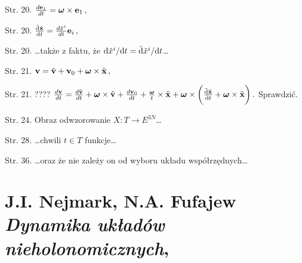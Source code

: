 \documentclass[a4paper,11pt]{article}
\numberwithin{equation}{section}
\begin{document}
Str. 20.
$\frac{ d\mathbf{e}_{ 1 } }{ dt } = \boldsymbol{\omega} \times \mathbf{e}_{ 1 } \, ,$

Str. 20.
$\frac{ \tilde{ \mathrm{d} } \tilde{ \mathbf{x} } }{ \mathrm{d} t }
= \frac{ d\tilde{ x }^{ i } }{ dt } \mathbf{e}_{ i } \, ,$

Str. 20. \ldots także z faktu, że
$\mathrm{d} \tilde{ x }^{ i } / \mathrm{d} t = \tilde{ \mathrm{d} } \tilde{ x
}^{ i } / \mathrm{d} t$\ldots

Str. 21.
$\mathbf{v} = \tilde{ \mathbf{v} } + \mathbf{v}_{ 0 } +
\boldsymbol{\omega} \times \tilde{ \mathbf{x} } \, ,$

Str. 21. ????
$\frac{ d\mathbf{v} }{ dt } = \frac{ d\tilde{ \mathbf{v} } }{ dt }
+ \boldsymbol{\omega} \times \tilde{ \mathbf{v} } + \frac{
  d\mathbf{v}_{ 0 } }{ dt } + \frac{ \boldsymbol{\omega} }{ t }
\times \tilde{ \mathbf{x} } + \boldsymbol{\omega}  \times \bigg(
\frac{ \tilde{ \mathrm{d} } \tilde{ \mathbf{x} } }{ \mathrm{d} t } +
\boldsymbol{\omega} \times \tilde{ \mathbf{x} } \bigg) \, .$
Sprawdzić.

Str. 24. Obraz odwzorowanie
$X : T \rightarrow E^{ 3N }$\ldots

Str. 28. \ldots chwili $t \in T$ funkcje\ldots

Str. 36. \ldots oraz że nie zależy on od wyboru układu
współrzędnych\ldots


\VerSpaceTwo










\newpage

\section{ %
  J.I. Nejmark, N.A. Fufajew \\
  \textit{Dynamika układów nieholonomicznych},
  \cite{NejmarkFufajewDynamikaUkladowNieholonomicznych1971}}



\end{document}
